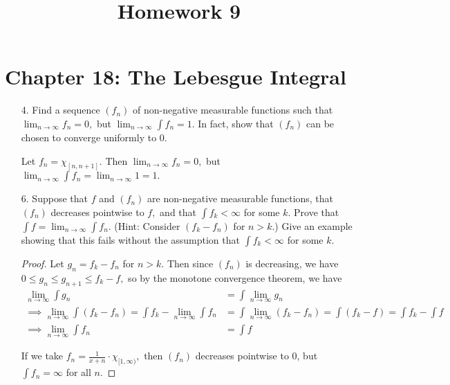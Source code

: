 \documentclass{article}
\begin{document}
\title{Homework 9}
\maketitle
\thispagestyle{fancy}

\section*{Chapter 18: The Lebesgue Integral}

\begin{itemize}
	\item[4.] Find a sequence $(f_n)$ of non-negative measurable functions such that $\lim_{n\to\infty} f_n=0,$ but $\lim_{n\to\infty} \int f_n=1.$ In fact, show that $(f_n)$ can be chosen to converge uniformly to 0.
		\begin{soln}
			Let $f_n=\chi_{[n, n+1]}.$ Then $\lim_{n\to\infty} f_n=0,$ but $\lim_{n\to\infty} \int f_n=\lim_{n\to\infty} 1 = 1.$
		\end{soln}

	\item[6.] Suppose that $f$ and $(f_n)$ are non-negative measurable functions, that $(f_n)$ decreases pointwise to $f,$ and that $\int f_k<\infty$ for some $k.$ Prove that $\int f=\lim_{n\to\infty} \int f_n.$ (Hint: Consider $(f_k-f_n)$ for $n>k.$) Give an example showing that this fails without the assumption that $\int f_k<\infty$ for some $k.$
		\begin{proof}
			Let $g_n=f_k-f_n$ for $n>k.$ Then since $(f_n)$ is decreasing, we have $0\le g_n\le g_{n+1}\le f_k-f,$ so by the monotone convergence theorem, we have
			\begin{align*}
				\lim_{n\to\infty} \int g_n &= \int\lim_{n\to\infty} g_n \\
				\implies \lim_{n\to\infty}\int (f_k-f_n)= \int f_k - \lim_{n\to\infty} \int f_n &=\int \lim_{n\to\infty} (f_k-f_n) = \int (f_k-f) = \int f_k - \int f \\
				\implies \lim_{n\to\infty} \int f_n &= \int f
			\end{align*}

			If we take $f_n=\frac{1}{x+n}\cdot \chi_{[1, \infty)},$ then $(f_n)$ decreases pointwise to 0, but $\int f_n=\infty$ for all $n.$
		\end{proof}


\end{itemize}
\end{document}
